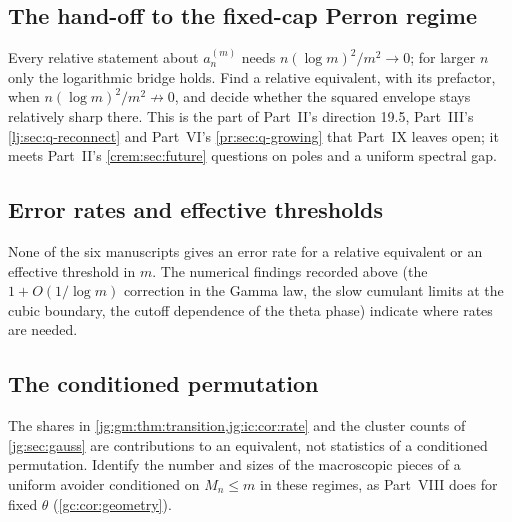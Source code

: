 \documentclass[11pt,a4paper]{article}
\theoremstyle{definition}\newaliascnt{definition}{theorem}
\theoremstyle{remark}\newaliascnt{remark}{theorem}
\begin{document}
\subsection{The hand-off to the fixed-cap Perron regime}
\label{jg:sec:q-perron}
Every relative statement about $a_n^{(m)}$ needs $n(\log m)^2/m^2\to0$; for
larger $n$ only the logarithmic bridge holds. Find a relative equivalent, with
its prefactor, when $n(\log m)^2/m^2\not\to0$, and decide whether the squared
envelope stays relatively sharp there. This is the part of Part~II's direction
19.5, Part~III's \cref{lj:sec:q-reconnect} and Part~VI's
\cref{pr:sec:q-growing} that Part~IX leaves open; it meets Part~II's
\cref{crem:sec:future} questions on poles and a uniform spectral gap.

\subsection{Error rates and effective thresholds}
\label{jg:sec:q-rates}
None of the six manuscripts gives an error rate for a relative equivalent or an
effective threshold in $m$. The numerical findings recorded above (the
$1+O(1/\log m)$ correction in the Gamma law, the slow cumulant limits at the
cubic boundary, the cutoff dependence of the theta phase) indicate where rates
are needed.

\subsection{The conditioned permutation}
\label{jg:sec:q-conditioned}
The shares in \cref{jg:gm:thm:transition,jg:ic:cor:rate} and the cluster counts
of \cref{jg:sec:gauss} are contributions to an equivalent, not statistics of a
conditioned permutation. Identify the number and sizes of the macroscopic
pieces of a uniform avoider conditioned on $M_n\le m$ in these regimes, as
Part~VIII does for fixed $\theta$ (\cref{gc:cor:geometry}).

\clearpage
{}
\appendix
\end{document}
